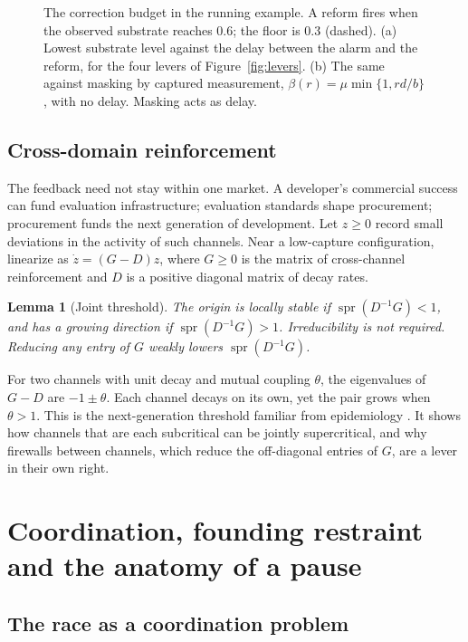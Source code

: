 \documentclass[11pt]{article}
\theoremstyle{plain}
\newtheorem{lemma}{Lemma}
\theoremstyle{definition}
\newcommand{\spr}{\operatorname{spr}}
\begin{document}
\begin{figure}[t]
\centering

\caption{The correction budget in the running example. A reform fires when the observed substrate reaches $0.6$; the floor is $0.3$ (dashed). (a) Lowest substrate level against the delay between the alarm and the reform, for the four levers of Figure~\ref{fig:levers}. (b) The same against masking by captured measurement, $\beta(r)=\mu\min\{1,rd/b\}$, with no delay. Masking acts as delay.}
\label{fig:chain}
\end{figure}

\subsection{Cross-domain reinforcement}

The feedback need not stay within one market. A developer's commercial success can fund evaluation infrastructure; evaluation standards shape procurement; procurement funds the next generation of development. Let $z\ge0$ record small deviations in the activity of such channels. Near a low-capture configuration, linearize as $\dot z=(G-D)z$, where $G\ge0$ is the matrix of cross-channel reinforcement and $D$ is a positive diagonal matrix of decay rates.

\begin{lemma}[Joint threshold]\label{lem:mmatrix}
The origin is locally stable if $\spr(D^{-1}G)<1$, and has a growing direction if $\spr(D^{-1}G)>1$. Irreducibility is not required. Reducing any entry of $G$ weakly lowers $\spr(D^{-1}G)$.
\end{lemma}

For two channels with unit decay and mutual coupling $\theta$, the eigenvalues of $G-D$ are $-1\pm\theta$. Each channel decays on its own, yet the pair grows when $\theta>1$. This is the next-generation threshold familiar from epidemiology \citep{vandendriessche2002}. It shows how channels that are each subcritical can be jointly supercritical, and why firewalls between channels, which reduce the off-diagonal entries of $G$, are a lever in their own right.

\section{Coordination, founding restraint and the anatomy of a pause}\label{sec:pause}

\subsection{The race as a coordination problem}
\end{document}
